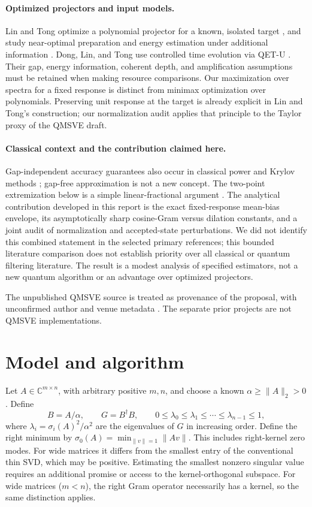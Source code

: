\documentclass[11pt]{article}
\newcommand{\C}{\mathbb{C}}
\begin{document}
\paragraph{Optimized projectors and input models.}
Lin and Tong optimize a polynomial projector for a known, isolated target
\cite{LinTongFilter}, and study near-optimal preparation and energy estimation
under additional information \cite{LinTongGround}. Dong, Lin, and Tong use
controlled time evolution via QET-U \cite{DongLinTong}. Their gap, energy
information, coherent depth, and amplification assumptions must be retained
when making resource comparisons. Our maximization over spectra for a fixed
response is distinct from minimax optimization over polynomials. Preserving
unit response at the target is already explicit in Lin and Tong's
construction; our normalization audit applies that principle to the Taylor
proxy of the QMSVE draft.

\paragraph{Classical context and the contribution claimed here.}
Gap-independent accuracy guarantees also occur in classical power and Krylov
methods \cite{MuscoMusco}; gap-free approximation is not a new concept.
The two-point extremization below is a simple linear-fractional argument
\cite{CharnesCooper}. The analytical contribution developed in this report is
the exact fixed-response mean-bias envelope, its asymptotically sharp
cosine-Gram versus dilation constants, and a joint audit of normalization and
accepted-state perturbations. We did not identify this combined statement in
the selected primary references; this bounded literature comparison does not
establish priority over all classical or quantum filtering literature.
The result is a modest analysis of specified estimators, not a new quantum
algorithm or an advantage over optimized projectors.

The unpublished QMSVE source is treated as provenance of the proposal, with
unconfirmed author and venue metadata \cite{QMSVE}. The separate prior
projects \cite{QCG2023,QCG2024} are not QMSVE implementations.
\section{Model and algorithm}
Let $A\in\C^{m\times n}$, with arbitrary positive $m,n$, and choose a known $\alpha\geq\|A\|_2>0$. Define
\[
 B=A/\alpha,\qquad G=B^\dagger B,\qquad
 0\leq \lambda_0\leq\lambda_1\leq\cdots\leq\lambda_{n-1}\leq1,
\]
where $\lambda_i=\sigma_i(A)^2/\alpha^2$ are the eigenvalues of $G$ in increasing order. Define the right minimum by $\sigma_0(A)=\min_{\|v\|=1}\|Av\|$. This includes right-kernel zero modes. For wide matrices it differs from the smallest entry of the conventional thin SVD, which may be positive. Estimating the smallest nonzero singular value requires an additional promise or access to the kernel-orthogonal subspace. For wide matrices ($m<n$), the right Gram operator necessarily has a kernel, so the same distinction applies.
\end{document}

